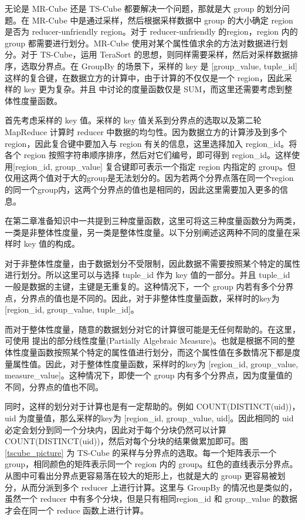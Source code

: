无论是 MR-Cube 还是 TS-Cube 都要解决一个问题，那就是大 group 的划分问题。在 MR-Cube 中是通过采样，然后根据采样数据中 group 的大小确定 region 是否为 reducer-unfriendly region。对于 reducer-unfriendly 的region，region 内的 group 都需要进行划分。MR-Cube 使用对某个属性值求余的方法对数据进行划分。对于 TS-Cube，运用 TeraSort 的思想，则同样需要采样，然后对采样数据排序，选取分界点。在 GroupBy 的场景下，采样的 key 是 [group\_value, tuple\_id] 这样的复合键，在数据立方的计算中，由于计算的不仅仅是一个 region，因此采样的 key 更为复杂。并且\cite{tao2013minimal} 中讨论的度量函数仅是 SUM，而这里还需要考虑到整体性度量函数。

首先考虑采样的 key 值。采样的 key 值关系到分界点的选取以及第二轮 MapReduce 计算时 reducer 中数据的均匀性。因为数据立方的计算涉及到多个 region，因此复合键中要加入与 region 有关的信息，这里选择加入 region\_id。将各个 region 按照字符串顺序排序，然后对它们编号，即可得到 region\_id。这样使用[region\_id, group\_value] 复合键即可表示一个指定 region 内指定的 group。但仅用这两个值对于大的group是无法划分的。因为若两个分界点落在同一个region的同一个group内，这两个分界点的值也是相同的，因此这里需要加入更多的信息。

在第二章准备知识中一共提到三种度量函数，这里可将这三种度量函数分为两类，一类是非整体性度量，另一类是整体性度量。以下分别阐述这两种不同的度量在采样时 key 值的构成。

对于非整体性度量，由于数据划分不受限制，因此数据不需要按照某个特定的属性进行划分。所以这里可以与选择 tuple\_id 作为 key 值的一部分。并且 tuple\_id 一般是数据的主键，主键是无重复的。这种情况下，一个 group 内若有多个分界点，分界点的值也是不同的。因此，对于非整体性度量函数，采样时的key为 [region\_id, group\_value, tuple\_id]。

而对于整体性度量，随意的数据划分对它的计算很可能是无任何帮助的。在这里，可使用 \cite{nandi2011distributed} 提出的部分线性度量(Partially Algebraic Measure)。也就是根据不同的整体性度量函数按照某个特定的属性值进行划分，而这个属性值在多数情况下都是度量属性值。因此，对于整体性度量函数，采样时的key为 [region\_id, group\_value, measure\_value]。这种情况下，即使一个 group 内有多个分界点，因为度量值的不同，分界点的值也不同。

同时，这样的划分对于计算也是有一定帮助的。例如 COUNT(DISTINCT(uid))，uid 为度量值，那么采样的key为 [region\_id, group\_value, uid]。因此相同的 uid 必定会划分到同一个分块内，因此对于每个分块仍然可以计算 COUNT(DISTINCT(uid))，然后对每个分块的结果做累加即可。图\ref{tscube_picture} 为 TS-Cube 的采样与分界点的选取。每一个矩阵表示一个 group，相同颜色的矩阵表示同一个 region 内的 group。红色的直线表示分界点。从图中可看出分界点更容易落在较大的矩形上，也就是大的 group 更容易被划分，从而分派到多个 reducer 上进行计算。这里与 GroupBy 的情况也是类似的，虽然一个 reducer 中有多个分块，但是只有相同region\_id 和 group\_value 的数据才会在同一个 reduce 函数上进行计算。

